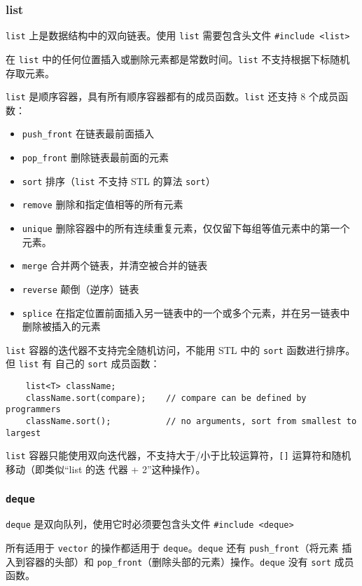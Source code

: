 \documentclass[UTF8]{ctexart}
\begin{document}
\subsubsection{list}
\texttt{list} 上是数据结构中的双向链表。使用 \texttt{list} 需要包含头文件
\texttt{#include <list>}

在 \texttt{list} 中的任何位置插入或删除元素都是常数时间。\texttt{list} 不支持根据下标随机存取元素。

\texttt{list} 是顺序容器，具有所有顺序容器都有的成员函数。\texttt{list} 还支持 8 个成员函数：
\begin{itemize}
    \item \texttt{push\_front} 在链表最前面插入
    \item \texttt{pop\_front} 删除链表最前面的元素
    \item \texttt{sort} 排序（\texttt{list} 不支持 STL 的算法 \texttt{sort}）
    \item \texttt{remove} 删除和指定值相等的所有元素
    \item \texttt{unique} 删除容器中的所有连续重复元素，仅仅留下每组等值元素中的第一个元素。
    \item \texttt{merge} 合并两个链表，并清空被合并的链表
    \item \texttt{reverse} 颠倒（逆序）链表
    \item \texttt{splice} 在指定位置前面插入另一链表中的一个或多个元素，并在另一链表中删除被插入的元素
\end{itemize}

\texttt{list} 容器的迭代器不支持完全随机访问，不能用 STL 中的 \texttt{sort} 函数进行排序。但 \texttt{list} 有
自己的 \texttt{sort} 成员函数：
\begin{verbatim}
    list<T> className;
    className.sort(compare);    // compare can be defined by programmers
    className.sort();           // no arguments, sort from smallest to largest
\end{verbatim}

\texttt{list} 容器只能使用双向迭代器，不支持大于/小于比较运算符，\texttt{[]} 运算符和随机移动（即类似“list 的迭
代器 + 2”这种操作）。

\subsubsection{\texttt{deque}}
\texttt{deque} 是双向队列，使用它时必须要包含头文件 \texttt{#include <deque>}

所有适用于 \texttt{vector} 的操作都适用于 \texttt{deque}。\texttt{deque} 还有 \texttt{push\_front}（将元素
插入到容器的头部）和 \texttt{pop\_front}（删除头部的元素）操作。\texttt{deque} 没有 \texttt{sort} 成员函数。
\end{document}

